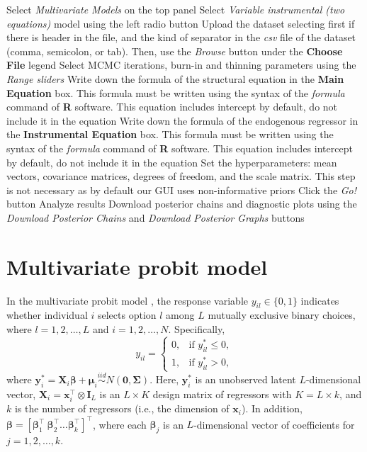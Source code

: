 \begin{algorithm}[h!]
	\caption{Instrumental variable model}\label{alg:IVReg}
	\begin{algorithmic}[1]  		 			
		\State Select \textit{Multivariate Models} on the top panel
		\State Select \textit{Variable instrumental (two equations)} model using the left radio button
		\State Upload the dataset selecting first if there is header in the file, and the kind of separator in the \textit{csv} file of the dataset (comma, semicolon, or tab). Then, use the \textit{Browse} button under the \textbf{Choose File} legend
		\State Select MCMC iterations, burn-in and thinning parameters using the \textit{Range sliders}
		\State Write down the formula of the structural equation in the \textbf{Main Equation} box. This formula must be written using the syntax of the \textit{formula} command of \textbf{R} software. This equation includes intercept by default, do not include it in the equation
		\State Write down the formula of the endogenous regressor in the \textbf{Instrumental Equation} box. This formula must be written using the syntax of the \textit{formula} command of \textbf{R} software. This equation includes intercept by default, do not include it in the equation
		\State Set the hyperparameters: mean vectors, covariance matrices, degrees of freedom, and the scale matrix. This step is not necessary as by default our GUI uses non-informative priors
		\State Click the \textit{Go!} button
		\State Analyze results
		\State Download posterior chains and diagnostic plots using the \textit{Download Posterior Chains} and \textit{Download Posterior Graphs} buttons
	\end{algorithmic} 
\end{algorithm}

\section{Multivariate probit model}\label{sec74}

In the multivariate probit model \cite{Edwards2003}, the response variable \( y_{il} \in \{0, 1\} \) indicates whether individual \( i \) selects option \( l \) among \( L \) mutually exclusive binary choices, where \( l = 1, 2, \dots, L \) and \( i = 1, 2, \dots, N \). Specifically,
\[
y_{il} = 
\begin{cases}
	0, & \text{if } y_{il}^* \leq 0, \\[3pt]
	1, & \text{if } y_{il}^* > 0,
\end{cases}
\]
where \( \bm{y}_i^* = \bm{X}_i \bm{\beta} + \bm{\mu}_i \stackrel{iid}{\sim}N(\bm{0}, \bm{\Sigma}) \). Here, \( \bm{y}_i^* \) is an unobserved latent \( L \)-dimensional vector, \( \bm{X}_i =   \bm{x}_i^\top \otimes \bm{I}_L \) is an \( L \times K \) design matrix of regressors with \( K = L \times k \), and \( k \) is the number of regressors (i.e., the dimension of \( \bm{x}_i \)). In addition, \( \bm{\beta} = [\bm{\beta}_1^\top \ \bm{\beta}_2^\top \dots \bm{\beta}_k^\top]^\top \), where each \( \bm{\beta}_j \) is an \( L \)-dimensional vector of coefficients for \( j = 1, 2, \dots, k \).

